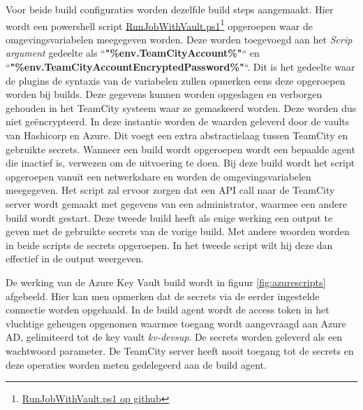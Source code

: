 \newpage
Voor beide build configuraties worden dezelfde build steps aangemaakt. Hier wordt een powershell script \href{https://github.com/Rayenasr/Secrets-management-thesis/blob/main/TeamCity/RunJobWithVault.ps1}{RunJobWithVault.ps1}\footnote{\href{https://github.com/Rayenasr/Secrets-management-thesis/blob/main/TeamCity/RunJobWithVault.ps1}{RunJobWithVault.ps1 op github}} opgeroepen waar de omgevingsvariabelen meegegeven worden. Deze worden toegevoegd aan het \textit{Scrip argument} gedeelte als ``\textbf{"\%env.TeamCityAccount\%"}`` en ``\textbf{"\%env.TeamCityAccountEncryptedPassword\%"}``. Dit is het gedeelte waar de plugins de syntaxis van de variabelen zullen opmerken eens deze opgeroepen worden bij builds. Deze gegevens kunnen worden opgeslagen en verborgen gehouden in het TeamCity systeem waar ze gemaskeerd worden. Deze worden dus niet geëncrypteerd. In deze instantie worden de waarden geleverd door de vaults van Hashicorp en Azure. Dit voegt een extra abstractielaag tussen TeamCity en gebruikte secrets. Wanneer een build wordt opgeroepen wordt een bepaalde agent die inactief is, verwezen om de uitvoering te doen. Bij deze build wordt het script opgeroepen vanuit een netwerkshare en worden de omgevingsvariabelen meegegeven. Het script zal ervoor zorgen dat een API call naar de TeamCity server wordt gemaakt met gegevens van een administrator, waarmee een andere build wordt gestart. Deze tweede build heeft als enige werking een output te geven met de gebruikte secrets van de vorige build. Met andere woorden worden in beide scripts de secrets opgeroepen. In het tweede script wilt hij deze dan effectief in de output weergeven.

De werking van de Azure Key Vault build wordt in figuur \ref{fig:azurescripts} afgebeeld. Hier kan men opmerken dat de secrets via de eerder ingestelde connectie worden opgehaald. In de build agent wordt de access token in het vluchtige geheugen opgenomen waarmee toegang wordt aangevraagd aan Azure AD, gelimiteerd tot de key vault \textit{kv-devsup}. De secrets worden geleverd als een wachtwoord parameter. De TeamCity server heeft nooit toegang tot de secrets en deze operaties worden meten gedelegeerd aan de build agent. \autocite{azurekvplug}

